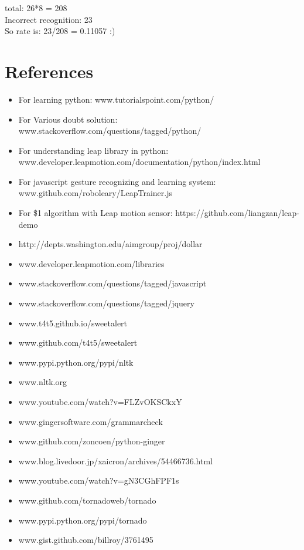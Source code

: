 \documentclass[11pt,a4paper]{article}
\begin{document}
    \vspace{.3cm}
	total: 26*8 =  208\\
	Incorrect recognition: 23\\
	So rate is: 23/208 = 0.11057    :)
	\section{References}
    \begin{itemize}
        \item For learning python:  www.tutorialspoint.com/python/
        \item For Various doubt solution:  www.stackoverflow.com/questions/tagged/python/
        \item For understanding leap library in python: www.developer.leapmotion.com/documentation/python/index.html
        \item For javascript gesture recognizing and learning system:  www.github.com/roboleary/LeapTrainer.js
        \item For \$1 algorithm with Leap motion sensor:  https://github.com/liangzan/leap-demo
        \item  http://depts.washington.edu/aimgroup/proj/dollar
        \item  www.developer.leapmotion.com/libraries
        \item  www.stackoverflow.com/questions/tagged/javascript
        \item  www.stackoverflow.com/questions/tagged/jquery
        \item  www.t4t5.github.io/sweetalert
        \item  www.github.com/t4t5/sweetalert
        \item  www.pypi.python.org/pypi/nltk
        \item  www.nltk.org
        \item  www.youtube.com/watch?v=FLZvOKSCkxY
        \item  www.gingersoftware.com/grammarcheck
        \item  www.github.com/zoncoen/python-ginger
        \item  www.blog.livedoor.jp/xaicron/archives/54466736.html
        \item  www.youtube.com/watch?v=gN3CGhFPF1s
        \item  www.github.com/tornadoweb/tornado
        \item  www.pypi.python.org/pypi/tornado
        \item  www.gist.github.com/billroy/3761495

\end{itemize}
\end{document}
